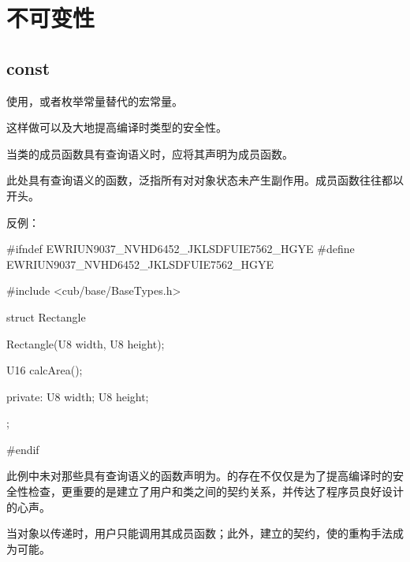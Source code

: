 \begin{savequote}[45mm]
\end{savequote}

\chapter{不可变性}
\label{ch:immutability}

\section{const}

\begin{content}

\begin{regulation}
使用，或者枚举常量替代的宏常量。
\end{regulation}

这样做可以及大地提高编译时类型的安全性。

\begin{regulation}
当类的成员函数具有查询语义时，应将其声明为成员函数。
\end{regulation}

此处具有查询语义的函数，泛指所有对对象状态未产生副作用。成员函数往往都以开头。

反例：
\begin{leftbar}
\begin{c++}[caption={cub/math/Rectangle.h}]
#ifndef EWRIUN9037_NVHD6452_JKLSDFUIE7562_HGYE
#define EWRIUN9037_NVHD6452_JKLSDFUIE7562_HGYE

#include <cub/base/BaseTypes.h>

struct Rectangle
{
    Rectangle(U8 width, U8 height);

    U16 calcArea();

private:
    U8 width;
    U8 height;
};

#endif
\end{c++}
\end{leftbar}

此例中未对那些具有查询语义的函数声明为。的存在不仅仅是为了提高编译时的安全性检查，更重要的是建立了用户和类之间的契约关系，并传达了程序员良好设计的心声。

当对象以传递时，用户只能调用其成员函数；此外，建立的契约，使的重构手法成为可能。


\end{content}
